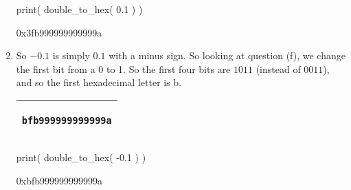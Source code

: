 \documentclass[pdftex,11pt]{article}
\begin{document}
\begin{enumerate}
\begin{python}
print( double_to_hex( 0.1 ) )
\end{python}
\begin{pythonoutput}
0x3fb999999999999a
\end{pythonoutput}




\begin{comment}
\underline{Matlab Check}:
\begin{verbatim}

>> format hex; 0.1, format

ans =

   3fb999999999999a

\end{verbatim}
\end{comment}

\item  
So $-0.1$ is simply $0.1$ with a minus sign.
So looking at question (f), we change the first bit from a 0 to 1. 
So the first four bits are $1011$ (instead of $0011$), and so the first hexadecimal letter is b.
\begin{center}
\begin{tabular}{|c|}
\hline
\begin{minipage}{0.17\textwidth}
\begin{verbatim}
bfb999999999999a
\end{verbatim}
\end{minipage}\\
\hline
\end{tabular}
\end{center}



\begin{python}
print( double_to_hex( -0.1 ) )
\end{python}
\begin{pythonoutput}
0xbfb999999999999a
\end{pythonoutput}




\begin{comment}



\underline{Matlab Check}:
\begin{verbatim}

>> format hex; -0.1, format

ans =

   bfb999999999999a

\end{verbatim}


\end{comment}
\end{enumerate}
\end{document}
